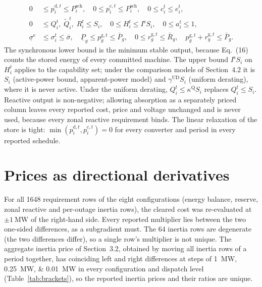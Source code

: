 \documentclass[11pt,a4paper]{article}
\begin{document}
\begin{align}
  0 &\le p^{\mathrm{d},t}_i \le P^{\mathrm{sch}}_i , \quad
  0 \le p^{\mathrm{c},t}_i \le P^{\mathrm{sch}}_i , \quad
  0 \le c_i^t \le e_i^t , \nonumber \\
  0 &\le Q_i^t, \; \tilde{Q}_i^t, \; R_i^t \le S_i , \quad
  0 \le H_i^t \le I^{\mathrm{s}} S_i , \quad
  0 \le a_i^t \le 1 , \nonumber \\
  \underline{\sigma}^{\mathrm{e}} &\le \sigma_i^t \le \bar{\sigma} , \quad
  \underline{P}_g \le p^{\mathrm{g},t}_g \le \bar{P}_g , \quad
  0 \le r^{\mathrm{g},t}_g \le \bar{R}_g , \quad
  p^{\mathrm{g},t}_g + r^{\mathrm{g},t}_g \le \bar{P}_g .
  \label{eq:domains}
\end{align}
The synchronous lower bound is the minimum stable output, because
Eq.~(16) counts the stored energy of every committed machine. The upper bound
$I^{\mathrm{s}} S_i$ on $H_i^t$ applies to the capability set; under the
comparison models of Section~4.2 it is $S_i$ (active-power bound,
apparent-power model) and $\gamma^{\mathrm{UD}} S_i$ (uniform derating),
where it is never active. Under the uniform derating,
$Q_i^t \le \kappa^{\mathrm{Q}} S_i$ replaces $Q_i^t \le S_i$. Reactive
output is non-negative; allowing absorption as a separately priced column
leaves every reported cost, price and voltage unchanged and is never used,
because every zonal reactive requirement binds. The linear relaxation of the
store is tight: $\min(p^{\mathrm{d},t}_i, p^{\mathrm{c},t}_i) = 0$ for every
converter and period in every reported schedule.

\section{Prices as directional derivatives}
\label{s:duals}

For all \num{1648} requirement rows of the eight configurations (energy
balance, reserve, zonal reactive and per-outage inertia rows), the cleared
cost was re-evaluated at $\pm\SI{1}{\MW}$ of the right-hand side. Every
reported multiplier lies between the two one-sided differences, as a
subgradient must. The \num{64} inertia rows are degenerate (the two
differences differ), so a single row's multiplier is not unique. The
aggregate inertia price of Section~3.2, obtained by moving all inertia rows
of a period together, has coinciding left and right differences at steps of
\SIlist{1;0.25;0.01}{\MW} in every configuration and dispatch level
(Table~\ref{tab:brackets}), so the reported inertia prices and their ratios
are unique.
\end{document}
